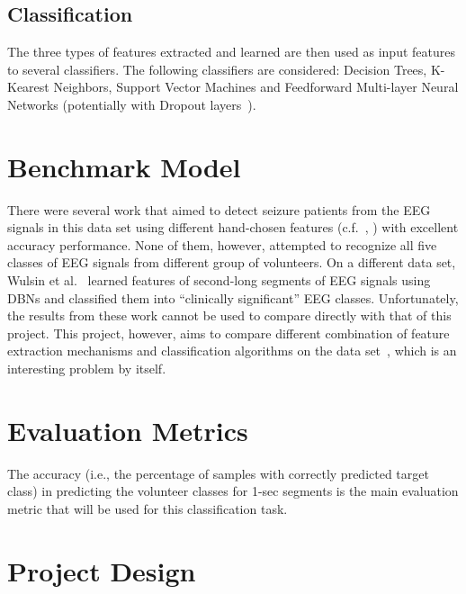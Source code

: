 \documentclass[12pt]{article}
\begin{document}
\subsection{Classification}

The three types of features extracted and learned are then used as input features to several classifiers. The following classifiers are considered: Decision Trees, K-Kearest Neighbors, Support Vector Machines and Feedforward Multi-layer Neural Networks (potentially with Dropout layers~\cite{srivastava2014dropout}).

\section{Benchmark Model}

There were several work that aimed to detect seizure patients from the EEG signals in this data set using different hand-chosen features (c.f.~\cite{nigam2004neural}, \cite{kabir2016epileptic}) with excellent accuracy performance. None of them, however, attempted to recognize all five classes of EEG signals from different group of volunteers. On a different data set, Wulsin et al.~\cite{wulsin2011modeling} learned features of second-long segments of EEG signals using DBNs and classified them into ``clinically significant'' EEG classes. Unfortunately, the results from these work cannot be used to compare directly with that of this project. This project, however, aims to compare different combination of feature extraction mechanisms and classification algorithms on the data set~\cite{andrzejak2001indications}, which is an interesting problem by itself.

\section{Evaluation Metrics}

The accuracy (i.e., the percentage of samples with correctly predicted target class) in predicting the volunteer classes for 1-sec segments is the main evaluation metric that will be used for this classification task.

\section{Project Design}
\end{document}
